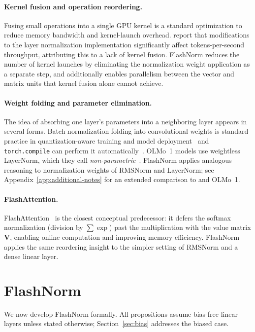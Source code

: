 \documentclass{article}
\begin{document}
\paragraph{Kernel fusion and operation reordering.}
Fusing small operations into a single GPU kernel is a standard optimization to
reduce memory bandwidth and kernel-launch overhead. \citet{openelm} report
that modifications to the layer normalization implementation significantly affect
tokens-per-second throughput, attributing this to a lack of kernel fusion. FlashNorm
reduces the number of kernel launches by eliminating the normalization weight
application as a separate step, and additionally enables parallelism between the
vector and matrix units that kernel fusion alone cannot achieve.

\paragraph{Weight folding and parameter elimination.}
The idea of absorbing one layer's parameters into a neighboring layer appears in
several forms. Batch normalization folding into convolutional weights is standard
practice in quantization-aware training and model deployment~\citep{quantJacob, convBN}
and \verb+torch.compile+ can perform it automatically~\citep{torchCompileFuse}.
OLMo~1 models use weightless LayerNorm, which they call
\emph{non-parametric}~\citep{olmo2}. FlashNorm applies analogous reasoning to
normalization weights of RMSNorm and LayerNorm; see Appendix~\ref{app:additional-notes}
for an extended comparison to \citep{remove-norm2} and OLMo~1.

\paragraph{FlashAttention.}
FlashAttention~\citep{flash-attention} is the closest conceptual predecessor:
it defers the softmax normalization (division by $\sum \exp$) past the multiplication
with the value matrix $\mathbf{V}$, enabling online computation and improving memory
efficiency. FlashNorm applies the same reordering insight to the simpler setting of
RMSNorm and a dense linear layer.

\section{FlashNorm}
We now develop FlashNorm formally. All propositions assume bias-free linear layers
unless stated otherwise; Section~\ref{sec:bias} addresses the biased case.
\end{document}
